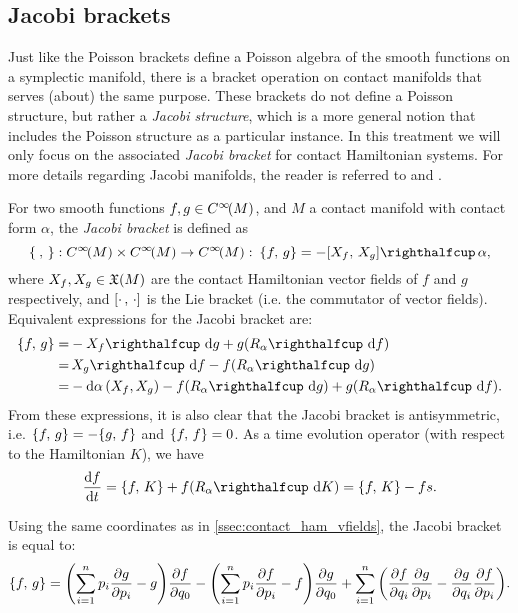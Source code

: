 \subsection{Jacobi brackets}
Just like the Poisson brackets define a Poisson algebra of the smooth functions on a symplectic manifold, there is a bracket operation on contact manifolds that serves (about) the same purpose. These brackets do not define a Poisson structure, but rather a \emph{Jacobi structure}, which is a more general notion that includes the Poisson structure as a particular instance. In this treatment we will only focus on the associated \emph{Jacobi bracket} for contact Hamiltonian systems. For more details regarding Jacobi manifolds, the reader is referred to \cite[chap. V]{Libermann1987} and \cite{DeLeon2020}.

For two smooth functions \(f, g \in C^\infty\!\qty(M)\), and \(M\) a contact manifold with contact form \(\alpha\), the \emph{Jacobi bracket} is defined as
\begin{equation}
    \jacobi{\:}{}: \functions{M} \times \functions{M} \to \functions{M}:\: \jacobi{f}{g} = -\intpr{\liebr{X_f}{X_g}}{\alpha},
\end{equation}
where \(X_f, X_g \in \mathfrak{X}\qty(M)\) are the contact Hamiltonian vector fields of \(f\) and \(g\) respectively, and \(\qty[\cdot\,,\,\cdot]\) is the Lie bracket (i.e. the commutator of vector fields). Equivalent expressions for the Jacobi bracket are: \cite{Libermann1987}
\begin{equation}
    \begin{split}
        \jacobi{f}{g} =& -\intpr{X_f}{\dd{g}} + g(\intpr{R_\alpha}{\dd{f}}) \\
                      =& \, \intpr{X_g}{\dd{f}} - f(\intpr{R_\alpha}{\dd{g}}) \\
                      =& -\dd{\alpha}(X_f, X_g) - f(\intpr{R_\alpha}{\dd{g}}) + g(\intpr{R_\alpha}{\dd{f}}).\\
    \end{split}
\end{equation}
From these expressions, it is also clear that the Jacobi bracket is antisymmetric, i.e. \(\{f,\,g\} = - \{g,\,f\}\) and \(\{f,\,f\} = 0\). As a time evolution operator (with respect to the Hamiltonian \(K\)), we have
\begin{equation}
     \dv{f}{t} = \jacobi{f}{K} + f(\intpr{R_\alpha}{\dd{K}}) = \jacobi{f}{K} - fs.
\end{equation}

Using the same coordinates as in \cref{ssec:contact_ham_vfields}, the Jacobi bracket is equal to:
\begin{equation}
     \{f,\,g\} = \qty(\sum_{i=1}^n p_i \pdv{g}{p_i} - g)\pdv{f}{q_0} - \qty(\sum_{i=1}^n p_i \pdv{f}{p_i} - f)\pdv{g}{q_0} 
    + \sum_{i=1}^n\qty(\pdv{f}{q_i}\pdv{g}{p_i} - \pdv{g}{q_i}\pdv{f}{p_i}).
\end{equation}

